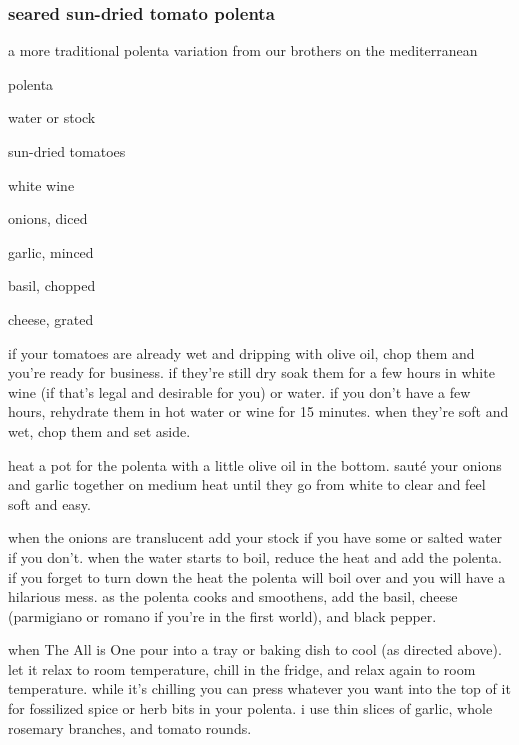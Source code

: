 \subsubsection{seared sun-dried tomato polenta}

a more traditional polenta variation from our brothers on the mediterranean

\begin{ingredients}
  \item polenta
  \item water or stock
  \item sun-dried tomatoes
  \item white wine
  \item onions, diced
  \item garlic, minced
  \item basil, chopped
  \item cheese, grated
\end{ingredients}

if your tomatoes are already wet and dripping with olive oil, chop them and 
you're ready for business. if they're still dry soak them for a few hours in 
white wine (if that's legal and desirable for you) or water. if you don't have 
a few hours, rehydrate them in hot water or wine for 15 minutes. when they're 
soft and wet, chop them and set aside.

heat a pot for the polenta with a little olive oil in the bottom. saut\'{e} 
your onions and garlic together on medium heat until they go from white to 
clear and feel soft and easy.

when the onions are translucent add your stock if you have some or salted 
water if you don't. when the water starts to boil, reduce the heat and add the 
polenta. if you forget to turn down the heat the polenta will boil over and 
you will have a hilarious mess. as the polenta cooks and smoothens, add the 
basil, cheese (parmigiano or romano if you're in the first world), and black 
pepper.

when The All is One pour into a tray or baking dish to cool (as directed 
above). let it relax to room temperature, chill in the fridge, and relax again 
to room temperature. while it's chilling you can press whatever you want into 
the top of it for fossilized spice or herb bits in your polenta. i use thin 
slices of garlic, whole rosemary branches, and tomato rounds.

